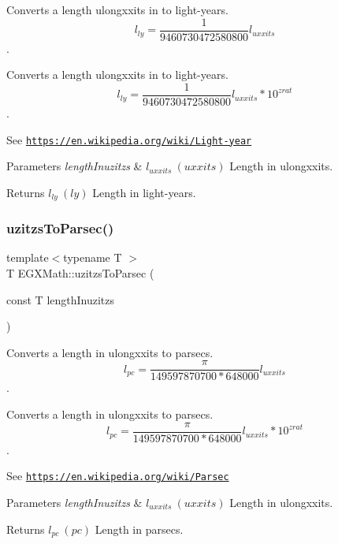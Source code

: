 Converts a length ulongxxits in to light-\/years. \[ l_{ly}= \frac{1}{9460730472580800} l_{uxxits} \]. 

Converts a length ulongxxits in to light-\/years. \[ l_{ly}= \frac{1}{9460730472580800} l_{uxxits} * 10^{zrat} \].

See \href{https://en.wikipedia.org/wiki/Light-year}{\tt https\+://en.\+wikipedia.\+org/wiki/\+Light-\/year} 
\begin{DoxyParams}{Parameters}
{\em length\+Inuzitzs} & $ l_{uxxits}\ (uxxits)$ Length in ulongxxits. \\
\hline
\end{DoxyParams}
\begin{DoxyReturn}{Returns}
$ l_{ly}\ (ly)$ Length in light-\/years. 
\end{DoxyReturn}
\mbox{\label{group___e_g_x_math-_conversions-_length_conversions-uzitzs-_astronomical_ga028a17a589e3f3d0c09daa6fbe664989}} 
\subsubsection{\texorpdfstring{uzitzs\+To\+Parsec()}{uzitzsToParsec()}}
{\footnotesize\ttfamily template$<$typename T $>$ \\
T E\+G\+X\+Math\+::uzitzs\+To\+Parsec (\begin{DoxyParamCaption}\item[{const T}]{length\+Inuzitzs }\end{DoxyParamCaption})}



Converts a length in ulongxxits to parsecs. \[ l_{pc}=\frac{\pi}{149597870700 * 648000} l_{uxxits} \]. 

Converts a length in ulongxxits to parsecs. \[ l_{pc}=\frac{\pi}{149597870700 * 648000} l_{uxxits} * 10^{zrat} \].

See \href{https://en.wikipedia.org/wiki/Parsec}{\tt https\+://en.\+wikipedia.\+org/wiki/\+Parsec} 
\begin{DoxyParams}{Parameters}
{\em length\+Inuzitzs} & $ l_{uxxits}\ (uxxits)$ Length in ulongxxits. \\
\hline
\end{DoxyParams}
\begin{DoxyReturn}{Returns}
$ l_{pc}\ (pc)$ Length in parsecs. 
\end{DoxyReturn}
